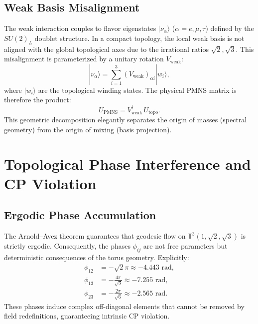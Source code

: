 \documentclass[12pt,a4paper]{article}
\begin{document}
\subsection{Weak Basis Misalignment}
The weak interaction couples to flavor eigenstates $|\nu_\alpha\rangle$ ($\alpha = e, \mu, \tau$) defined by the $SU(2)_L$ doublet structure. In a compact topology, the local weak basis is not aligned with the global topological axes due to the irrational ratios $\sqrt{2}, \sqrt{3}$. This misalignment is parameterized by a unitary rotation $V_{\text{weak}}$:
\begin{equation}
    |\nu_\alpha\rangle = \sum_{i=1}^3 (V_{\text{weak}})_{\alpha i} |w_i\rangle,
\end{equation}
where $|w_i\rangle$ are the topological winding states. The physical PMNS matrix is therefore the product:
\begin{equation}
    U_{\text{PMNS}} = V_{\text{weak}}^\dagger \, U_{\text{topo}}.
\end{equation}
This geometric decomposition elegantly separates the origin of masses (spectral geometry) from the origin of mixing (basis projection).

\section{Topological Phase Interference and CP Violation}
\subsection{Ergodic Phase Accumulation}
The Arnold--Avez theorem guarantees that geodesic flow on $\mathbb{T}^3(1,\sqrt{2},\sqrt{3})$ is strictly ergodic. Consequently, the phases $\phi_{ij}$ are not free parameters but deterministic consequences of the torus geometry. Explicitly:
\begin{align}
    \phi_{12} &= -\sqrt{2}\pi \approx -4.443 \text{ rad}, \\
    \phi_{13} &= -\frac{4\pi}{\sqrt{3}} \approx -7.255 \text{ rad}, \\
    \phi_{23} &= -\frac{2\pi}{\sqrt{6}} \approx -2.565 \text{ rad}.
\end{align}
These phases induce complex off-diagonal elements that cannot be removed by field redefinitions, guaranteeing intrinsic CP violation.
\end{document}
